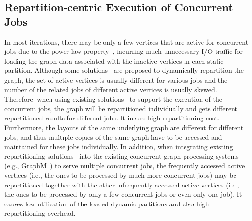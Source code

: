 \documentclass[10pt,journal,compsoc]{IEEEtran}
\begin{document}
\subsection{Repartition-centric Execution of Concurrent Jobs}\label{section:Repartitioning}
\vspace{-2pt}
In most iterations, there may be only a few vertices that are active for concurrent jobs due to the power-law property~\cite{PowerGraph}, incurring much unnecessary I/O traffic for loading the graph data associated with the inactive vertices in each static partition.
Although some solutions~\cite{Vora, ReGraph} are proposed to dynamically repartition the graph, the set of active vertices is usually different for various jobs and the number of the related jobs of different active vertices is usually skewed.
Therefore, when using existing solutions~\cite{Vora, ReGraph} to support the execution of the concurrent jobs, the graph will be repartitioned individually and gets different repartitioned results for different jobs. It incurs high repartitioning cost. Furthermore, the layouts of the same underlying graph are different for different jobs, and thus multiple copies of the same graph have to be accessed and maintained for these jobs individually. In addition, when integrating existing repartitioning solutions~\cite{Vora, ReGraph} into the existing concurrent graph processing systems (e.g., GraphM~\cite{GraphM}) to serve multiple concurrent jobs, the frequently accessed active vertices (i.e., the ones to be processed by much more concurrent jobs) may be repartitioned together with the other infrequently accessed active vertices (i.e., the ones to be processed by only a few concurrent jobs or even only one job).
It causes low utilization of the loaded dynamic partitions and also high repartitioning overhead.
\end{document}
